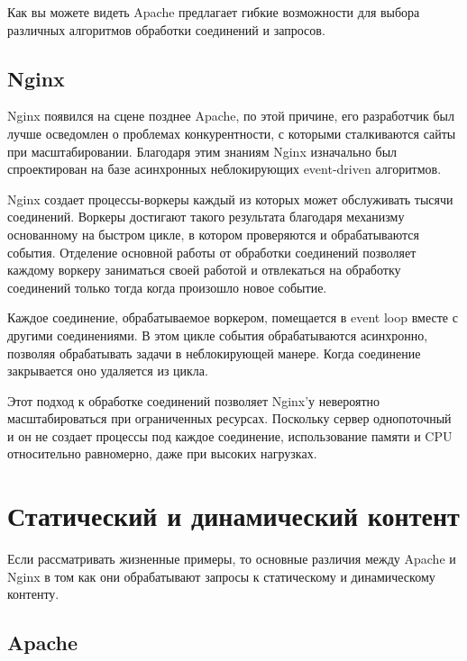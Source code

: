 \documentclass[14pt, a4paper]{article}
\begin{document}
Как вы можете видеть Apache предлагает гибкие возможности для выбора различных 
алгоритмов обработки соединений и запросов.


\subsection*{Nginx}


Nginx появился на сцене позднее Apache, по этой причине, его разработчик был лучше осведомлен 
о проблемах конкурентности, с которыми сталкиваются сайты при масштабировании. Благодаря этим 
знаниям Nginx изначально был спроектирован на базе асинхронных неблокирующих event-driven алгоритмов.


Nginx создает процессы-воркеры каждый из которых может обслуживать тысячи соединений. Воркеры 
достигают такого результата благодаря механизму основанному на быстром цикле, в котором проверяются 
и обрабатываются события. Отделение основной работы от обработки соединений позволяет каждому воркеру 
заниматься своей работой и отвлекаться на обработку соединений только тогда когда произошло новое событие.


Каждое соединение, обрабатываемое воркером, помещается в event loop вместе с другими соединениями. 
В этом цикле события обрабатываются асинхронно, позволяя обрабатывать задачи в неблокирующей манере. 
Когда соединение закрывается оно удаляется из цикла.


Этот подход к обработке соединений позволяет Nginx'у невероятно масштабироваться при ограниченных 
ресурсах. Поскольку сервер однопоточный и он не создает процессы под каждое соединение, использование 
памяти и CPU относительно равномерно, даже при высоких нагрузках.\\




\section*{Статический и динамический контент}

Если рассматривать жизненные примеры, то основные различия между Apache и Nginx в том как они 
обрабатывают запросы к статическому и динамическому контенту.

\subsection*{Apache}
\end{document}
